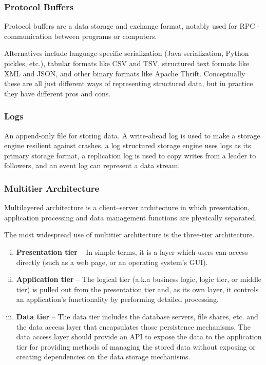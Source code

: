 \documentclass{article}
\begin{document}
    \subsubsection{Protocol Buffers}
    Protocol buffers are a data storage and exchange format, notably used for RPC - communication between programs or computers.
    
    Alternatives include language-specific serialization (Java serialization, Python pickles, etc.), tabular formats like CSV and TSV, structured text formats like XML and JSON, and other binary formats like Apache Thrift. Conceptually these are all just different ways of representing structured data, but in practice they have different pros and cons.

    
    \subsubsection{Logs}
    An append-only file for storing data. A write-ahead log is used to make a storage engine resilient against crashes, a log structured storage engine uses logs as its primary storage format, a replication log is used to copy writes from a leader to followers, and an event log can represent a data stream.

    \subsubsection{Multitier Architecture}
     Multilayered architecture is a client–server architecture in which presentation, application processing and data management functions are physically separated. 
    
    The most widespread use of multitier architecture is the three-tier architecture.

    \begin{enumerate}[i.]
        \item \textbf{Presentation tier} -- In simple terms, it is a layer which users can access directly (such as a web page, or an operating system's GUI).
        \item \textbf{Application tier} -- The logical tier (a.k.a business logic, logic tier, or middle tier) is pulled out from the presentation tier and, as its own layer, it controls an application’s functionality by performing detailed processing.
        \item \textbf{Data tier} -- The data tier includes the database servers, file shares, etc. and the data access layer that encapsulates those persistence mechanisms. The data access layer should provide an API to expose the data to the application tier for providing methods of managing the stored data without exposing or creating dependencies on the data storage mechanisms.
    \end{enumerate}
    
\end{document}
